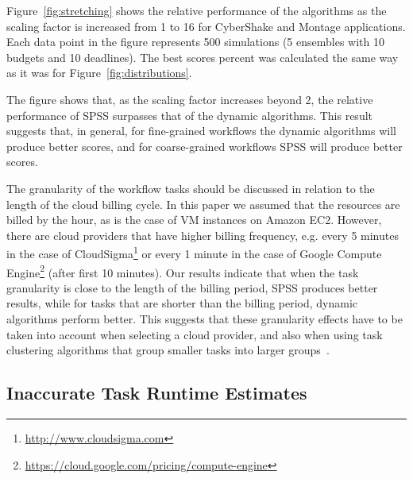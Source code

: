 \documentclass[preprint,5p]{elsarticle}
\begin{document}
Figure~\ref{fig:stretching} shows the relative performance of the algorithms as
the scaling factor is increased from 1 to 16 for CyberShake  and Montage
applications. Each data point in the figure represents 500 simulations (5
ensembles with 10 budgets and 10 deadlines). The best scores percent was
calculated the same way as it was for Figure~\ref{fig:distributions}.

The figure shows that, as the scaling factor increases beyond 2, the relative
performance of SPSS surpasses that of the dynamic algorithms.  This result
suggests that, in general, for fine-grained workflows the dynamic algorithms
will produce better scores, and for coarse-grained workflows SPSS will produce
better scores.

The granularity of the workflow tasks should be discussed in relation to the
length of the cloud billing cycle. In this paper we assumed that the resources
are billed by the hour, as is the case of VM instances on Amazon EC2.
However, there are cloud providers that have higher billing frequency, e.g.
every 5 minutes in the case of
CloudSigma\footnote{\url{http://www.cloudsigma.com}} or every 1 minute in the
case of Google Compute
Engine\footnote{\url{https://cloud.google.com/pricing/compute-engine}} (after
first 10 minutes). Our results indicate that when the task granularity is close
to the length of the billing period,  SPSS produces better results, while for
tasks that are shorter than the billing period,  dynamic algorithms perform
better. This suggests that these granularity effects have to be taken into account when
selecting a cloud provider, and also when using task clustering algorithms that
group smaller tasks into larger groups~\cite{ChenD12}.



\subsection{Inaccurate Task Runtime Estimates}
\label{sec:variances}
\end{document}

